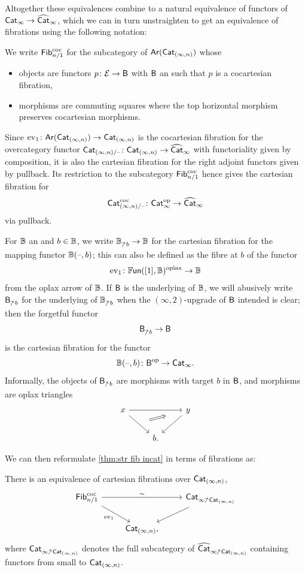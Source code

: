 \documentclass[a4paper,11pt]{article}
\begin{document}
Altogether these equivalences combine to a natural equivalence of
functors of \icats{} $\CatI \to \LCatI$, which we can in turn unstraighten to get
an equivalence of fibrations using the following notation:
\begin{notation}
  We write $\textup{\textsf{Fib}}_{n/1}^{\text{\textup{coc}}}$ for the subcategory of $\textup{\textsf{Ar}}(\textup{\textsf{Cat}}_{(\infty,n)})$
  whose
  \begin{itemize}
  \item objects are functors $p \colon \eE \to \oB$ with $\textup{\textsf{B}}$ an
    \icat{} such that $p$ is a cocartesian fibration,
  \item morphisms are commuting squares where the top horizontal
    morphism preserves cocartesian morphisms.
  \end{itemize}
  Since $\ev_{1} \colon \Ar(\CatIn) \to \CatIn$ is the cocartesian
  fibration for the overcategory functor $\CatInsl{\blank} \colon
  \CatIn \to \LCatI$ with functoriality given by composition, it is
  also the cartesian fibration for the right adjoint functors given by
  pullback. Its restriction to the subcategory $\textup{\textsf{Fib}}_{n/1}^{\text{\textup{coc}}}$
  hence gives the cartesian fibration for \[\CatInsl{\blank}^{\coc}
    \colon \CatI^{\op} \to \LCatI \]
  via pullback.
\end{notation}

\begin{notation}
  For $\mathbb{B}$ an \itcat{} and $b \in \mathbb{B}$, we write $\tB_{\upslash b}
  \to \tB$ for the cartesian fibration for the mapping \icat{} functor
  $\mathbb{B}(\text{\textendash},b)$; this can also be defined as the fibre at $b$ of the functor
  \[\ev_{1} \colon \FUN([1], \tB)^{\oplax} \to \tB\]
  from the oplax arrow \itcat{} of $\mathbb{B}$. 
  If $\textup{\textsf{B}}$ is the underlying \icat{} of $\mathbb{B}$, we
  will abusively write $\oB_{\upslash b}$ for the underlying \icat{}
  of $\tB_{\upslash b}$ when the $(\infty,2)$-upgrade of $\textup{\textsf{B}}$
  intended is clear; then the forgetful functor \[\oB_{\upslash b} \to
    \oB\]
  is the cartesian fibration for the functor
  \[ \tB(\blank,b) \colon \oB^{\op} \to \CatI. \]
  Informally, the objects of
  $\oB_{\upslash b}$ are morphisms with target $b$ in $\textup{\textsf{B}}$, and
  morphisms are oplax triangles
  \[
    \begin{tikzcd}
     x \ar[rr] \ar[dr, ""{name=A}] & & y \ar[dl] \\
     & b.
     \arrow[from=A,to=1-3,Rightarrow,shorten <=8pt, shorten >=20pt]
    \end{tikzcd}
  \]
\end{notation}

We can then reformulate \cref{thm:str fib incat} in terms of
fibrations as:
\begin{cornoproof}\label{cor:str as fib eqce}
  There is an equivalence of cartesian fibrations over $\textup{\textsf{Cat}}_{(\infty,n)}$,
  \[
    \begin{tikzcd}
     \Fib_{n/1}^{\coc} \ar[rr, "\sim"] \ar[dr, "\ev_{1}"'] & & \CatIlsl{\CatIn} \ar[dl] \\
      & \CatIn,
    \end{tikzcd}
  \]
  where $\CatIlsl{\CatIn}$ denotes the full subcategory of
  $\LCatIlsl{\CatIn}$ containing functors from small \icats{} to
  $\textup{\textsf{Cat}}_{(\infty,n)}$.
\end{cornoproof}
\end{document}
